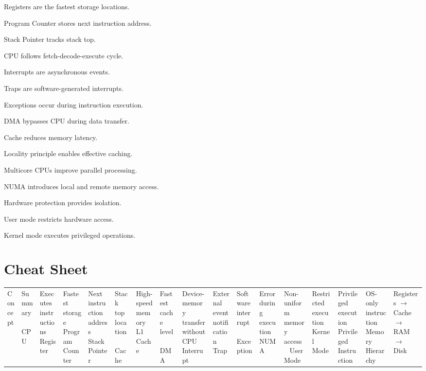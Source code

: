 \begin{revisionnotes}
\item Registers are the fastest storage locations.
\item Program Counter stores next instruction address.
\item Stack Pointer tracks stack top.
\item CPU follows fetch-decode-execute cycle.
\item Interrupts are asynchronous events.
\item Traps are software-generated interrupts.
\item Exceptions occur during instruction execution.
\item DMA bypasses CPU during data transfer.
\item Cache reduces memory latency.
\item Locality principle enables effective caching.
\item Multicore CPUs improve parallel processing.
\item NUMA introduces local and remote memory access.
\item Hardware protection provides isolation.
\item User mode restricts hardware access.
\item Kernel mode executes privileged operations.
\end{revisionnotes}

\section{Cheat Sheet}

\begin{longtable}{|p{5cm}|p{8cm}|}
\hline
Concept & Summary \
\hline
CPU & Executes instructions \
\hline
Register & Fastest storage \
\hline
Program Counter & Next instruction address \
\hline
Stack Pointer & Stack top location \
\hline
Cache & High-speed memory \
\hline
L1 Cache & Fastest cache level \
\hline
DMA & Device-memory transfer without CPU \
\hline
Interrupt & External event notification \
\hline
Trap & Software interrupt \
\hline
Exception & Error during execution \
\hline
NUMA & Non-uniform memory access \
\hline
User Mode & Restricted execution \
\hline
Kernel Mode & Privileged execution \
\hline
Privileged Instruction & OS-only instruction \
\hline
Memory Hierarchy & Registers $\rightarrow$ Cache $\rightarrow$ RAM $\rightarrow$ Disk \
\hline
\end{longtable}
